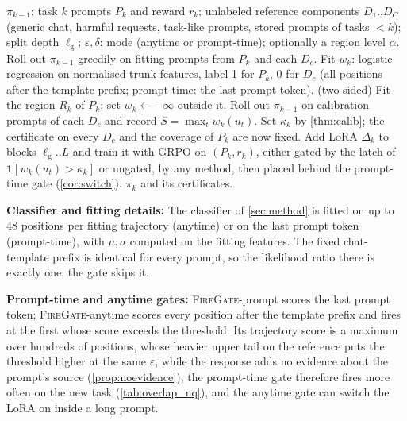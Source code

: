 \documentclass{article}
\theoremstyle{plain}
\theoremstyle{definition}
\theoremstyle{remark}
\renewcommand{\lg}{\ell_{\mathrm{g}}}
\newcommand{\ind}{\mathbf{1}}
\newcommand{\method}{\textsc{FireGate}}
\newcommand{\methodp}{\textsc{FireGate}-prompt}
\newcommand{\methoda}{\textsc{FireGate}-anytime}
\begin{document}
\begin{algorithm}[t]
\caption{\method{}: stage $k$ of a continual stream}
\label{alg:tripwire}
\begin{algorithmic}
 $\pi_{k-1}$; task $k$ prompts $P_k$ and reward $r_k$; unlabeled reference components
$D_1..D_C$ (generic chat, harmful requests, task-like prompts, stored prompts of tasks $<k$); split depth $\lg$;
$\varepsilon,\delta$; mode (anytime or prompt-time); optionally a region level $\alpha$.
\STATE Roll out $\pi_{k-1}$ greedily on fitting prompts from $P_k$ and each $D_c$.
\STATE Fit $w_k$: logistic regression on normalised trunk features, label 1 for $P_k$, 0 for $D_c$ (all positions
after the template prefix; prompt-time: the last prompt token).
\STATE (two-sided) Fit the region $R_k$ of $P_k$; set $w_k\leftarrow-\infty$ outside it.
\STATE Roll out $\pi_{k-1}$ on calibration prompts of each $D_c$ and record $S=\max_t w_k(u_t)$.
\STATE Set $\kappa_k$ by \cref{thm:calib}; the certificate on every $D_c$ and the coverage of $P_k$ are now fixed.
\STATE Add LoRA $\Delta_k$ to blocks $\lg..L$ and train it with GRPO on $(P_k,r_k)$, either gated by the latch of
$\ind[w_k(u_t)>\kappa_k]$ or ungated, by any method, then placed behind the prompt-time gate (\cref{cor:switch}).
 $\pi_k$ and its certificates.
\end{algorithmic}
\end{algorithm}

\textbf{Classifier and fitting details:} The classifier of \cref{sec:method} is fitted on up to 48 positions per
fitting trajectory (anytime) or on the last prompt token (prompt-time), with $\mu,\sigma$ computed on the fitting
features. The fixed chat-template prefix is identical for every prompt, so the likelihood ratio there is exactly one;
the gate skips it.

\textbf{Prompt-time and anytime gates:} \methodp{} scores the last prompt token; \methoda{} scores every position
after the template prefix and fires at the first whose score exceeds the threshold. Its trajectory score is a maximum
over hundreds of positions, whose heavier upper tail on the reference puts the threshold higher at the same
$\varepsilon$, while the response adds no evidence about the prompt's source (\cref{prop:noevidence}); the prompt-time
gate therefore fires more often on the new task (\cref{tab:overlap_nq}), and the anytime gate can switch the LoRA on
inside a long prompt.
\end{document}
